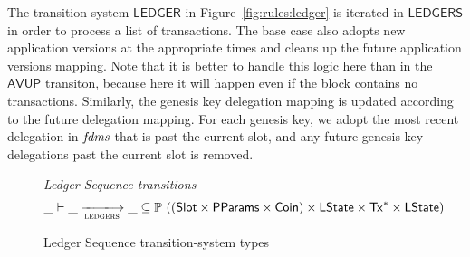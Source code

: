 \clearpage

The transition system $\mathsf{LEDGER}$ in Figure~\ref{fig:rules:ledger} is iterated
in $\mathsf{LEDGERS}$ in order to process a list of transactions.
The base case also adopts new application versions at the appropriate times
and cleans up the future application versions mapping.
Note that it is better to handle this logic here than in the $\mathsf{AVUP}$ transiton,
because here it will happen even if the block contains no transactions.
Similarly, the genesis key delegation mapping is updated according to the future delegation
mapping. For each genesis key, we adopt the most recent delegation in $\mathit{fdms}$
that is past the current slot, and any future genesis key delegations past the current
slot is removed.

\begin{figure}[htb]
  \emph{Ledger Sequence transitions}
  \begin{equation*}
    \_ \vdash
    \var{\_} \trans{ledgers}{\_} \var{\_}
    \subseteq \powerset ((\Slot\times\PParams\times\Coin) \times \LState \times \seqof{\Tx} \times \LState)
  \end{equation*}
  \caption{Ledger Sequence transition-system types}
  \label{fig:ts-types:ledgers}
\end{figure}

